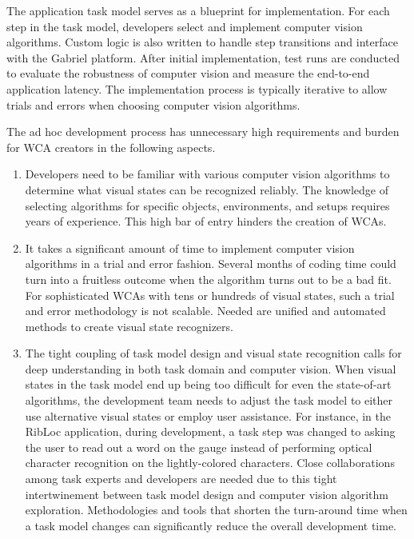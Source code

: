 The application task model serves as a blueprint for implementation. For each step
in the task model, developers select and implement computer vision algorithms.
Custom logic is also written to handle step transitions and interface with the
Gabriel platform. After initial implementation, test runs are conducted to
evaluate the robustness of computer vision and measure the end-to-end
application latency. The implementation process is typically iterative to allow
trials and errors when choosing computer vision algorithms.

The ad hoc development process has unnecessary high requirements and burden for
WCA creators in the following aspects.
\begin{enumerate}
  \item Developers need to be familiar with various computer vision algorithms
to determine what visual states can be recognized reliably. The knowledge of
selecting algorithms for specific objects, environments, and setups requires
years of experience. This high bar of entry hinders the creation of WCAs.
  \item It takes a significant amount of time to implement computer vision
algorithms in a trial and error fashion. Several months of coding time could
turn into a fruitless outcome when the algorithm turns out to be a bad fit. For
sophisticated WCAs with tens or hundreds of visual states, such a trial and
error methodology is not scalable. Needed are unified and automated methods to
create visual state recognizers.
  \item The tight coupling of task model design and visual state recognition
calls for deep understanding in both task domain and computer vision. When
visual states in the task model end up being too difficult for even the
state-of-art algorithms, the development team needs to adjust the task model to
either use alternative visual states or employ user assistance. For instance, in
the RibLoc application, during development, a task step was changed to asking
the user to read out a word on the gauge instead of performing optical character
recognition on the lightly-colored characters. Close collaborations among task
experts and developers are needed due to this tight intertwinement between task
model design and computer vision algorithm exploration. Methodologies and tools
that shorten the turn-around time when a task model changes can significantly
reduce the overall development time.
\end{enumerate}



